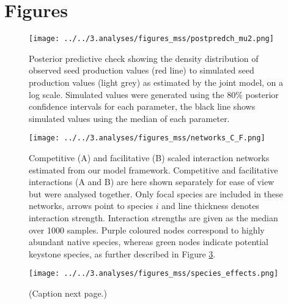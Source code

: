\documentclass[a4,12pt]{article}
\begin{document}
\section{Figures}


    \begin{figure}[H]
        \texttt{[image: ../../3.analyses/figures\_mss/postpredch\_mu2.png]}
        \caption{Posterior predictive check showing the density distribution of observed seed production values (red line) to simulated seed production values (light grey) as estimated by the joint model, on a log scale. Simulated values were generated using the 80\% posterior confidence intervals for each parameter, the black line shows simulated values using the median of each parameter. }
        \label{fig:ppcheckmu2}
    \end{figure}

    \begin{figure}[H]
        \begin{centering}
        \texttt{[image: ../../3.analyses/figures\_mss/networks\_C\_F.png]}
        \caption{Competitive (A) and facilitative (B) scaled interaction networks estimated from our model framework. Competitive and facilitative interactions (A and B) are here shown separately for ease of view but were analysed together. Only focal species are included in these networks, arrows point to species $i$ and line thickness denotes interaction strength. Interaction strengths are given as the median over 1000 samples. Purple coloured nodes correspond to highly abundant native species, whereas green nodes indicate potential keystone species, as further described in Figure \ref{fig:species}.}
        \label{fig:netwks}
       \end{centering}
    \end{figure}  


    \begin{figure}[H]
        \begin{centering}
        \texttt{[image: ../../3.analyses/figures\_mss/species\_effects.png]}
        \caption{(Caption next page.)}
        \label{fig:species}
        \end{centering}
    \end{figure} 
\end{document}
